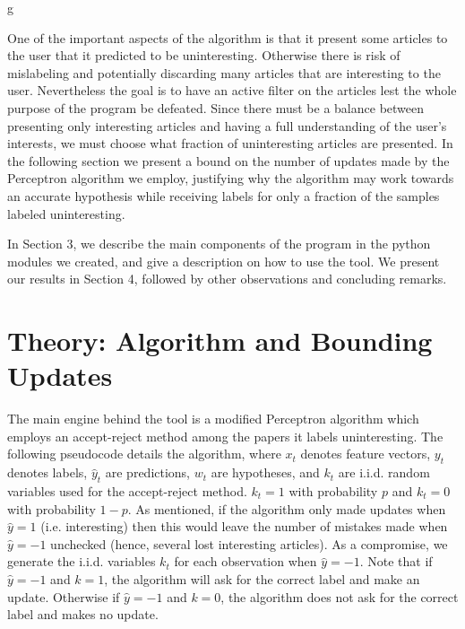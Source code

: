 g\documentclass[12pt]{article}
\begin{document}
One of the important aspects of the algorithm is that it present some articles to the user that it predicted to be uninteresting. Otherwise there is risk of mislabeling and potentially discarding many articles that are interesting to the user. Nevertheless the goal is to have an active filter on the articles lest the whole purpose of the program be defeated. Since there must be a balance between presenting only interesting articles and having a full understanding of the user's interests, we must choose what fraction of uninteresting articles are presented. In the following section we present a bound on the number of updates made by the Perceptron algorithm we employ, justifying why the algorithm may work towards an accurate hypothesis while receiving labels for only a fraction of the samples labeled uninteresting.

In Section 3, we describe the main components of the program in the python modules we created, and give a description on how to use the tool. We present our results in Section 4, followed by other observations and concluding remarks.



\section{Theory: Algorithm and Bounding Updates}

The main engine behind the tool is a modified Perceptron algorithm which employs an accept-reject method among the papers it labels uninteresting. The following pseudocode details the algorithm, where $x_t$ denotes feature vectors, $y_t$ denotes labels, $\widehat{y}_t$ are predictions, $w_t$ are hypotheses, and $k_t$ are i.i.d. random variables used for the accept-reject method. $k_t = 1$ with probability $p$ and $k_t = 0$ with probability $1-p$. As mentioned, if the algorithm only made updates when $\widehat{y}=1$ (i.e. interesting) then this would leave the number of mistakes made when $\widehat{y} = -1$ unchecked (hence, several lost interesting articles). As a compromise, we generate the i.i.d. variables $k_t$ for each observation when $\widehat{y} = -1$. Note that if $\widehat{y} = -1$ and $k=1$, the algorithm will ask for the correct label and make an update. Otherwise if $\widehat{y} = -1$ and $k=0$, the algorithm does not ask for the correct label and makes no update.\\
\end{document}

